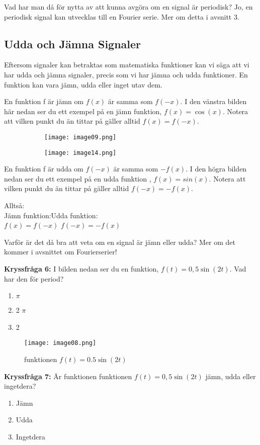 \documentclass{article}
\begin{document}
Vad har man då för nytta av att kunna avgöra om en signal är periodisk? Jo, en periodisk signal kan utvecklas till en Fourier serie. Mer om detta i avsnitt 3.

\subsection{Udda och Jämna Signaler}

Eftersom signaler kan betraktas som matematiska funktioner kan vi säga att vi har udda och jämna signaler, precis som vi har jämna och udda funktioner. En funktion kan vara jämn, udda eller inget utav dem.

En funktion f är jämn om $f(x)$ är samma som $f(-x)$.  I den vänstra bilden här nedan ser du ett exempel på en jämn funktion, $f(x)=\cos(x)$. Notera att vilken punkt du än tittar på gäller alltid  $f(x) = f(-x)$.

\begin{figure}[]
\centering
\begin{subfigure}{0.50\textwidth}
  \centering
  \texttt{[image: image09.png]}
  \caption{}
  \label{}
\end{subfigure}%
\begin{subfigure}{0.50\textwidth}
  \centering
  \texttt{[image: image14.png]}
  \caption{}
 \label{}
\end{subfigure}%
\caption{}
\label{}
\end{figure}

En funktion f är udda om $f(-x)$ är samma som $-f(x)$. I den högra bilden nedan ser du ett exempel på en udda funktion , $f(x)=sin(x)$. Notera att vilken punkt du än tittar på gäller alltid $f(-x) = -f(x)$.

Alltså:\\
Jämn funktion:\hfill Udda funktion: \\
$ f(x)=f(-x)$ \hfill $f(-x)=-f(x) $

Varför är det då bra att veta om en signal är jämn eller udda? Mer om det kommer i avsnittet om Fourierserier!

\textbf{Kryssfråga 6:} I bilden nedan ser du en funktion, $f(t)=0,5\sin(2t)$. Vad har den för period?
\begin{enumerate}[label={\alph*)},font={\bfseries}]
    \item $\pi$
    \item 2 $\pi$
    \item 2
\end{enumerate}
\newpage
\begin{figure}[ht]
\centerline{\texttt{[image: image08.png]}}
\caption{funktionen $f(t) = 0.5 \sin(2t)$}
\label{}
\end{figure}
\textbf{Kryssfråga 7:} Är funktionen funktionen $f(t)=0,5\sin(2t)$ jämn, udda eller ingetdera?
\begin{enumerate}[label={\alph*)},font={\bfseries}]
    \item Jämn
    \item Udda
    \item Ingetdera
\end{enumerate}
\end{document}
